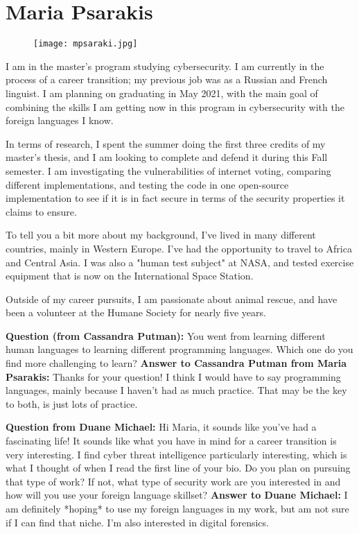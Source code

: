 \section{Maria Psarakis}
\begin{figure}
    \centering
    \texttt{[image: mpsaraki.jpg]}
\end{figure}

I am in the master's program studying cybersecurity. I am currently in the process of a career transition; my previous job was as a Russian and French linguist. I am planning on graduating in May 2021, with the main goal of combining the skills I am getting now in this program in cybersecurity with the foreign languages I know.

In terms of research, I spent the summer doing the first three credits of my master's thesis, and I am looking to complete and defend it during this Fall semester. I am investigating the vulnerabilities of internet voting, comparing different implementations, and testing the code in one open-source implementation to see if it is in fact secure in terms of the security properties it claims to ensure.

To tell you a bit more about my background, I've lived in many different countries, mainly in Western Europe. I've had the opportunity to travel to Africa and Central Asia. I was also a "human test subject" at NASA, and tested exercise equipment that is now on the International Space Station.

Outside of my career pursuits, I am passionate about animal rescue, and have been a volunteer at the Humane Society for nearly five years.

\textbf{Question (from Cassandra Putman):} You went from learning different human languages to learning different programming languages.  Which one do you find more challenging to learn?
\textbf{Answer to Cassandra Putman from Maria Psarakis:} Thanks for your question! I think I would have to say programming languages, mainly because I haven't had as much practice. That may be the key to both, is just lots of practice.

\textbf{Question from Duane Michael:} Hi Maria, it sounds like you've had a fascinating life! It sounds like what you have in mind for a career transition is very interesting. I find cyber threat intelligence particularly interesting, which is what I thought of when I read the first line of your bio. Do you plan on pursuing that type of work? If not, what type of security work are you interested in and how will you use your foreign language skillset?
\textbf{Answer to Duane Michael:} I am definitely *hoping* to use my foreign languages in my work, but am not sure if I can find that niche. I'm also interested in digital forensics.